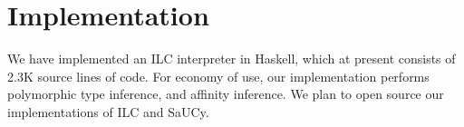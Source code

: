 \section{Implementation}
\label{sec:implementation}

We have implemented an ILC interpreter in Haskell, which at present consists of
2.3K source lines of code. For economy of use, our implementation performs
polymorphic type inference, and affinity inference.  We plan to open source our
implementations of ILC and SaUCy.

%
%
%
%
